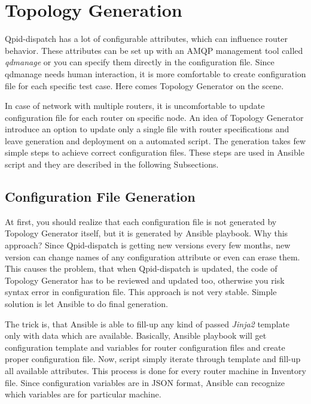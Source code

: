 \section{Topology Generation}
Qpid-dispatch has a lot of configurable attributes, which can influence router behavior. These attributes can be set up with an AMQP management tool called \emph{qdmanage}\footnotemark{} or you can specify them directly in the configuration file. Since qdmanage needs human interaction, it is more comfortable to create configuration file for each specific test case. Here comes Topology Generator on the scene.


In case of network with multiple routers, it is uncomfortable to update configuration file for each router on specific node. An idea of Topology Generator introduce an option to update only a single file with router specifications and leave generation and deployment on a automated script. The generation takes few simple steps to achieve correct configuration files. These steps are used in Ansible script and they are described in the following Subsections.

\subsection{Configuration File Generation}
At first, you should realize that each configuration file is not generated by Topology Generator itself, but it is generated by Ansible playbook. Why this approach? Since Qpid-dispatch is getting new versions every few months, new version can change names of any configuration attribute or even can erase them. This causes the problem, that when Qpid-dispatch is updated, the code of Topology Generator has to be reviewed and updated too, otherwise you risk syntax error in configuration file. This approach is not very stable. Simple solution is let Ansible to do final generation.

The trick is, that Ansible is able to fill-up any kind of passed \emph{Jinja2}\footnotemark{} template only with data which are available. Basically, Ansible playbook will get configuration template and variables for router configuration files and create proper configuration file. Now, script simply iterate through template and fill-up all available attributes. This process is done for every router machine in Inventory file. Since configuration variables are in JSON format, Ansible can recognize which variables are for particular machine.

